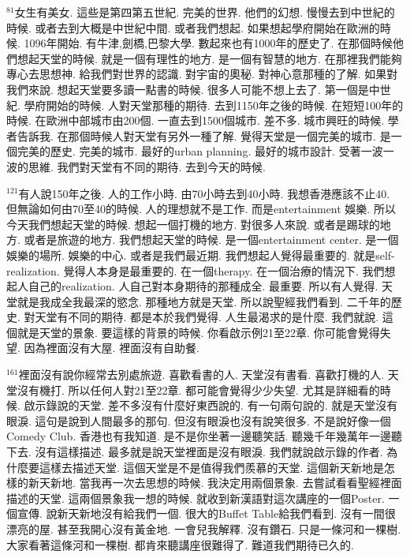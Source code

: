 \documentclass{book}
\begin{document}
$^{81}$女生有美女.
這些是第四第五世紀.
完美的世界.
他們的幻想.
慢慢去到中世紀的時候.
或者去到大概是中世紀中間.
或者我們想起.
如果想起學府開始在歐洲的時候.
1096年開始.
有牛津,劍橋,巴黎大學.
數起來也有1000年的歷史了.
在那個時候他們想起天堂的時候.
就是一個有理性的地方.
是一個有智慧的地方.
在那裡我們能夠專心去思想神.
給我們對世界的認識.
對宇宙的奧秘.
對神心意那種的了解.
如果對我們來說.
想起天堂要多讀一點書的時候.
很多人可能不想上去了.
第一個是中世紀.
學府開始的時候.
人對天堂那種的期待.
去到1150年之後的時候.
在短短100年的時候.
在歐洲中部城市由200個.
一直去到1500個城市.
差不多.
城市興旺的時候.
學者告訴我.
在那個時候人對天堂有另外一種了解.
覺得天堂是一個完美的城市.
是一個完美的歷史.
完美的城市.
最好的urban planning.
最好的城市設計.
受著一波一波的思維.
我們對天堂有不同的期待.
去到今天的時候.

$^{121}$有人說150年之後.
人的工作小時.
由70小時去到40小時.
我想香港應該不止40.
但無論如何由70至40的時候.
人的理想就不是工作.
而是entertainment 娛樂.
所以今天我們想起天堂的時候.
想起一個打機的地方.
對很多人來說.
或者是踢球的地方.
或者是旅遊的地方.
我們想起天堂的時候.
是一個entertainment center.
是一個娛樂的場所.
娛樂的中心.
或者是我們最近期.
我們想起人覺得最重要的.
就是self-realization.
覺得人本身是最重要的.
在一個therapy.
在一個治療的情況下.
我們想起人自己的realization.
人自己對本身期待的那種成全.
最重要.
所以有人覺得.
天堂就是我成全我最深的慾念.
那種地方就是天堂.
所以說聖經我們看到.
二千年的歷史.
對天堂有不同的期待.
都是本於我們覺得.
人生最渴求的是什麼.
我們就說.
這個就是天堂的景象.
要這樣的背景的時候.
你看啟示例21至22章.
你可能會覺得失望.
因為裡面沒有大屋.
裡面沒有自助餐.

$^{161}$裡面沒有說你經常去別處旅遊.
喜歡看書的人.
天堂沒有書看.
喜歡打機的人.
天堂沒有機打.
所以任何人對21至22章.
都可能會覺得少少失望.
尤其是詳細看的時候.
啟示錄說的天堂.
差不多沒有什麼好東西說的.
有一句兩句說的.
就是天堂沒有眼淚.
這句是說到人間最多的那句.
但沒有眼淚也沒有說笑很多.
不是說好像一個Comedy Club.
香港也有我知道.
是不是你坐著一邊聽笑話.
聽幾千年幾萬年一邊聽下去.
沒有這樣描述.
最多就是說天堂裡面是沒有眼淚.
我們就說啟示錄的作者.
為什麼要這樣去描述天堂.
這個天堂是不是值得我們羨慕的天堂.
這個新天新地是怎樣的新天新地.
當我再一次去思想的時候.
我決定用兩個景象.
去嘗試看看聖經裡面描述的天堂.
這兩個景象我一想的時候.
就收到新漢語對這次講座的一個Poster.
一個宣傳.
說新天新地沒有給我們一個.
很大的Buffet Table給我們看到.
沒有一間很漂亮的屋.
甚至我開心沒有黃金地.
一會兒我解釋.
沒有鑽石.
只是一條河和一棵樹.
大家看著這條河和一棵樹.
都肯來聽講座很難得了.
難道我們期待已久的.
\end{document}
